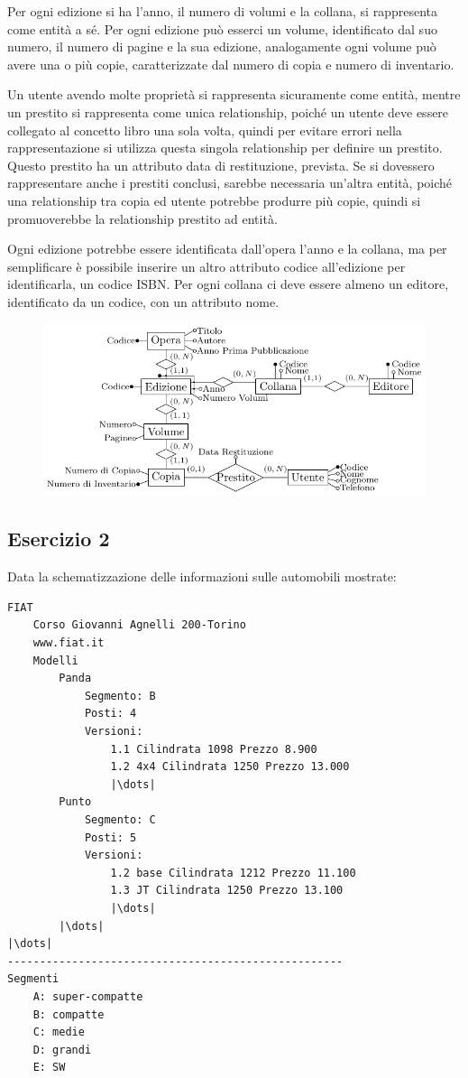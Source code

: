 \documentclass{article}
\numberwithin{equation}{subsection}
\begin{document}
Per ogni edizione si ha l'anno, il numero di volumi e la collana, si rappresenta come entità a sé. %
Per ogni edizione può esserci un volume, identificato dal suo numero, il numero di pagine e la sua edizione, analogamente ogni volume può avere una o più copie, 
caratterizzate dal numero di copia e numero di inventario. 

Un utente avendo molte proprietà si rappresenta sicuramente come entità, mentre un prestito si rappresenta come unica relationship, poiché un utente deve essere 
collegato al concetto libro una sola volta, quindi per evitare errori nella rappresentazione si utilizza questa singola relationship per definire un prestito. 
Questo prestito ha un attributo data di restituzione, prevista. Se si dovessero rappresentare anche i prestiti conclusi, sarebbe necessaria un'altra entità, poiché 
una relationship tra copia ed utente potrebbe produrre più copie, quindi si promuoverebbe la relationship prestito ad entità. 

Ogni edizione potrebbe essere identificata dall'opera l'anno e la collana, ma per semplificare è possibile inserire un altro attributo codice all'edizione per 
identificarla, un codice ISBN. Per ogni collana ci deve essere almeno un editore, identificato da un codice, con un attributo nome. 

\begin{figure}[H]%
    \centering%
    \includegraphics[scale=1.25]{schema_er_es_1.pdf}%
\end{figure}

\subsection{Esercizio 2}

Data la schematizzazione delle informazioni sulle automobili mostrate:
\begin{verbatim}
FIAT
    Corso Giovanni Agnelli 200-Torino
    www.fiat.it
    Modelli
        Panda
            Segmento: B
            Posti: 4
            Versioni:
                1.1 Cilindrata 1098 Prezzo 8.900
                1.2 4x4 Cilindrata 1250 Prezzo 13.000
                |\dots|        
        Punto
            Segmento: C
            Posti: 5
            Versioni:
                1.2 base Cilindrata 1212 Prezzo 11.100
                1.3 JT Cilindrata 1250 Prezzo 13.100
                |\dots|
        |\dots|
|\dots|
----------------------------------------------------
Segmenti
    A: super-compatte
    B: compatte
    C: medie
    D: grandi
    E: SW
\end{verbatim}
\end{document}
